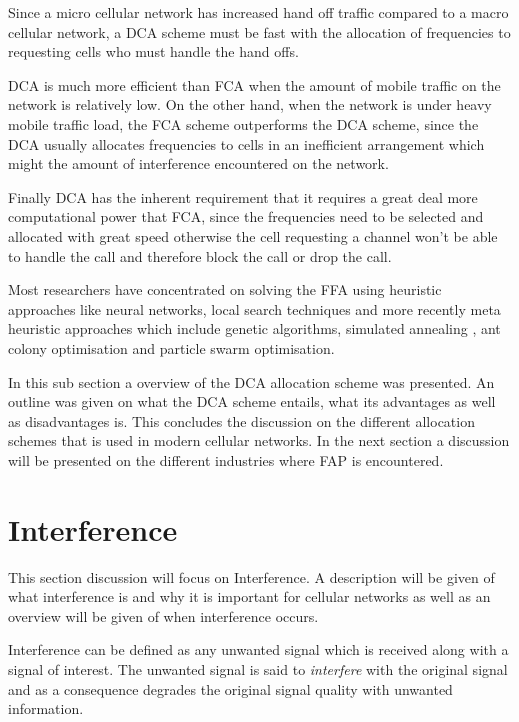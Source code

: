 Since a micro cellular network has increased hand off traffic compared to a macro cellular network, a DCA scheme must be fast with the allocation of frequencies to requesting cells who must handle the hand offs\cite{PrinciplesMobileCommunication,WirelessCommunications,MobileWirelessCommunicationss}.

DCA is much more efficient than FCA when the amount of mobile traffic on the network is relatively low. On the other hand, when the network is under heavy mobile traffic load, the FCA scheme outperforms the DCA scheme, since the DCA usually allocates frequencies to cells in an inefficient arrangement which might the amount of interference encountered on the network\cite{PrinciplesMobileCommunication,WirelessCommunications,MobileWirelessCommunicationss}.

Finally DCA has the inherent requirement that it requires a great deal more computational power that FCA, since the frequencies need to be selected and allocated with great speed otherwise the cell requesting a channel won't be able to handle the call and therefore block the call or drop the call\cite{PrinciplesMobileCommunication,WirelessCommunications,MobileWirelessCommunicationss}.

Most researchers have concentrated on solving the FFA using heuristic approaches like neural networks, local search techniques and more recently meta heuristic approaches which include genetic algorithms, simulated annealing , ant colony optimisation and particle swarm optimisation.

In this sub section a overview of the DCA allocation scheme was presented. An outline was given on what the DCA scheme entails, what its advantages as well as disadvantages is. This concludes the discussion on the different allocation schemes that is used in modern cellular networks. In the next section a discussion will be presented on the different industries where FAP is encountered.

\section{Interference}
\label{sec:Interference}
This section discussion will focus on Interference. A description will be given of what interference is and why it is important for cellular networks as well as an overview will be given of when interference occurs.

Interference can be defined as any unwanted signal which is received along with a signal of interest. The unwanted signal is said to \emph{interfere} with the original signal and as a consequence degrades the original signal quality with unwanted information\cite{WirelessDigitalCommunications}.

